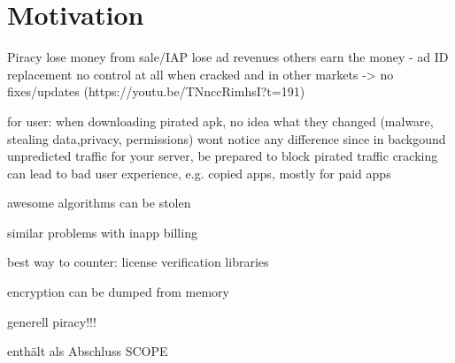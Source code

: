 \section{Motivation}\label{section:motivation}
Piracy\newline
lose money from sale/IAP\newline
lose ad revenues\newline
others earn the money  - ad ID replacement\newline
no control at all when cracked and in other markets -> no fixes/updates (https://youtu.be/TNnccRimhsI?t=191)\newline

for user: when downloading pirated apk, no idea what they changed (malware, stealing data,privacy, permissions)\newline
wont notice any difference since in backgound\newline
unpredicted traffic for your server, be prepared to block pirated traffic\newline
cracking can lead to bad user experience, e.g. copied apps, mostly for paid apps\newline

awesome algorithms can be stolen\newline

similar problems with inapp billing\newline

best way to counter: license verification libraries\newline

encryption can be dumped from memory\newline

generell piracy!!!\newline

enthält als Abschluss SCOPE\newline
